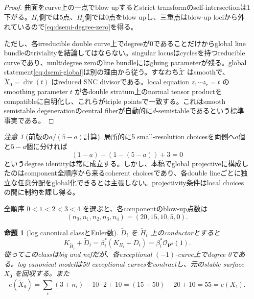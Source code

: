 \documentclass[11pt,a4paper]{ltjsarticle}
\newtheorem{proposition}[theorem]{命題}
\theoremstyle{definition}
\theoremstyle{remark}
\newtheorem{remark}[theorem]{注意}
\newcommand{\PP}{\mathbf P}
\begin{document}
\begin{proof}
曲面をcurve上の一点でblow upするとstrict transformのself-intersectionは1下がる。$H_i$側では5点、$H_j$側では0点をblow upし、三重点はblow-up lociから外れているので\eqref{eq:dsemi-degree-zero}を得る。

ただし、各irreducible double curve上でdegreeが0であることだけからglobal line bundleのtrivialityを結論してはならない。singular locusはcyclesを持つreducible curveであり、multidegree zeroのline bundleにはgluing parameterが残る。global statement\eqref{eq:dsemi-global}は別の理由から従う。すなわち$\widetilde{\mathcal X}$ はsmoothで、$\widetilde X_0=\operatorname{div}(t)$ はreduced SNC divisorである。local equation $z_1\cdots z_r=t$ のsmoothing parameter $t$ が各double stratum上のnormal tensor productをcompatibleに自明化し、これらがtriple pointsで一致する。これはsmooth semistable degenerationのcentral fiberが自動的に$d$-semistableであるという標準事実である。
\end{proof}

\begin{remark}[前版の$a/(5-a)$計算]
局所的に5 small-resolution choicesを両側へ$a$個と$5-a$個に分ければ
\[
 (1-a)+(1-(5-a))+3=0
\]
というdegree identityは常に成立する。しかし、本稿でglobal projectiveに構成したのはcomponent全順序から来るcoherent choicesであり、各double lineごとに独立な任意分配をglobal化できるとは主張しない。projectivity条件はlocal choicesの間に制約を課し得る。
\end{remark}

全順序 $0<1<2<3<4$ を選ぶと、各componentのblow-up点数は
\begin{equation}\label{eq:blowupcounts}
 (n_0,n_1,n_2,n_3,n_4)=(20,15,10,5,0).
\end{equation}

\begin{proposition}[log canonical classとEuler数]\label{prop:resolved-logcanonical}
$\widetilde D_i$ を $\widetilde H_i$ 上のconductorとすると
\begin{equation}\label{eq:logcanonical-pullback}
 K_{\widetilde H_i}+\widetilde D_i
 =\beta_i^*(K_{H_i}+D_i)
 =\beta_i^*\mathcal O_{\PP^2}(1).
\end{equation}
従ってこのclassはbig and nefだが、各exceptional $(-1)$-curve上でdegree 0である。log canonical modelは50 exceptional curvesをcontractし、元のstable surface $X_0$ を回収する。また
\begin{equation}\label{eq:resolved-euler}
 e(\widetilde X_0)
 =\sum_i(3+n_i)-10\cdot2+10
 =(15+50)-20+10=55=e(X_t).
\end{equation}
\end{proposition}
\end{document}
